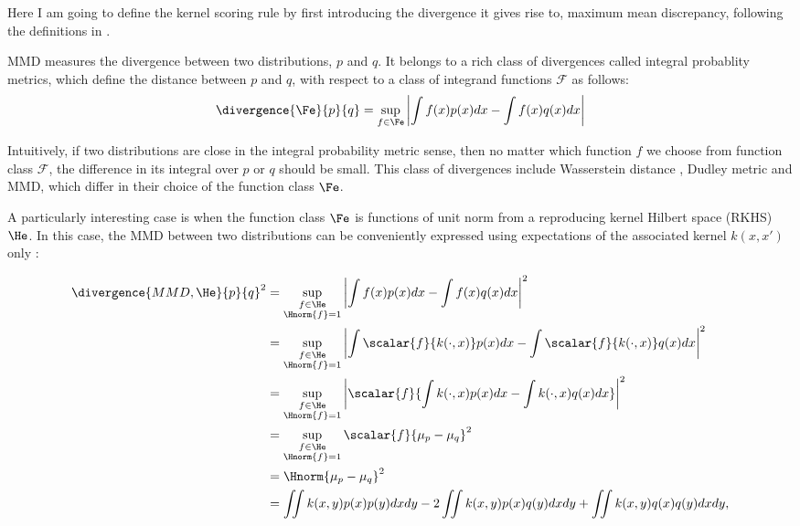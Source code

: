 Here I am going to define the kernel scoring rule by first introducing the divergence it gives rise to, maximum mean discrepancy, following the definitions in \cite{twosample}.

MMD measures the divergence between two distributions, $p$ and $q$. It belongs to a rich class of divergences called integral probablity metrics\cite{http://arxiv.org/pdf/0901.2698.pdf}, which define the distance between  $p$ and $q$, with respect to a class of integrand functions $\mathcal{F}$ as follows:
%
\begin{align}
	\divergence{\Fe}{p}{q} = \sup_{f\in\Fe}\left\vert\int f(x) p(x) dx - \int f(x) q(x) dx \right\vert
\end{align}
	
Intuitively, if two distributions are close in the integral probability metric sense, then no matter which function $f$ we choose from function class $\mathcal{F}$, the difference in its integral over $p$ or $q$ should be small. This class of divergences include Wasserstein distance \cite{}, Dudley metric \cite{} and MMD, which differ in their choice of the function class $\Fe$.

A particularly interesting case is when the function class $\Fe$ is functions of unit norm from a reproducing kernel Hilbert space (RKHS) $\He$. In this case, the MMD between two distributions can be conveniently expressed using expectations of the associated kernel $k(x, x')$ only \cite{Sriperumbudur2010}:


\begin{align}
\divergence{MMD,\He}{p}{q}^2 &= \sup_{\substack{f\in\He\\\Hnorm{f}=1}}\left\vert\int f(x) p(x) dx - \int f(x) q(x) dx\right\vert^2\label{eqn:rkhs-mmd}\\
	&=  \sup_{\substack{f\in\He\\\Hnorm{f}=1}}\left\vert\int \scalar{f}{k(\cdot,x)} p(x) dx - \int \scalar{f}{k(\cdot,x)} q(x) dx\right\vert^2\\
	&=  \sup_{\substack{f\in\He\\\Hnorm{f}=1}}\left\vert \scalar{f}{\int k(\cdot,x) p(x) dx - \int k(\cdot,x) q(x) dx}\right\vert^2\\
	&=  \sup_{\substack{f\in\He\\\Hnorm{f}=1}}\scalar{f}{\mu_{p} - \mu_{q}}^2\\
	&=  \Hnorm{\mu_{p} - \mu_{q}}^2\\ 
	&=  \iint k(x,y) p(x) p(y) dx dy	-2 \iint k(x,y) p(x) q(y) dx dy + \iint k(x,y) q(x) q(y) dx dy,\label{eqn:rkhs-mmd-lastline}
\end{align}

